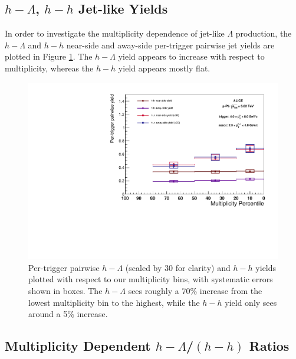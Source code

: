 \documentclass[ALICE,manyauthors]{ALICE_analysis_notes}
\begin{document}
\subsection{$h-\Lambda$, $h-h$ Jet-like Yields}

In order to investigate the multiplicity dependence of jet-like $\Lambda$ production, the $h-\Lambda$ and $h-h$ near-side and away-side per-trigger pairwise jet yields are plotted in Figure \ref{final_pairwise_yields}. The $h-\Lambda$ yield appears to increase with respect to multiplicity, whereas the $h-h$ yield appears mostly flat.

\begin{figure}[ht]
\centering
\includegraphics[width=6in]{figures/pairwise_plot.pdf}
\caption{Per-trigger pairwise $h-\Lambda$ (scaled by 30 for clarity) and $h-h$ yields plotted with respect to our multiplicity bins, with systematic errors shown in boxes. The $h-\Lambda$ sees roughly a 70\% increase from the lowest multiplicity bin to the highest, while the $h-h$ yield only sees around a 5\% increase.}
\label{final_pairwise_yields}
\end{figure}


\subsection{Multiplicity Dependent $h-\Lambda$/$(h-h)$ Ratios}
\end{document}
